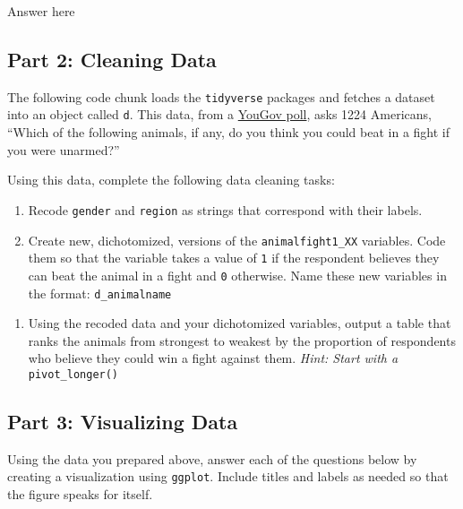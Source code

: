 \documentclass[
  letterpaper,
  DIV=11,
  numbers=noendperiod]{scrartcl}
\providecommand{\tightlist}{%
  \setlength{\itemsep}{0pt}\setlength{\parskip}{0pt}}\usepackage{longtable,booktabs,array}
\begin{document}
Answer here

\hypertarget{part-2-cleaning-data}{%
\subsection{Part 2: Cleaning Data}\label{part-2-cleaning-data}}

The following code chunk loads the \texttt{tidyverse} packages and
fetches a dataset into an object called \texttt{d}. This data, from a
\href{https://today.yougov.com/topics/society/articles-reports/2021/05/13/lions-and-tigers-and-bears-what-animal-would-win-f}{YouGov
poll}, asks 1224 Americans, ``Which of the following animals, if any, do
you think you could beat in a fight if you were unarmed?''

Using this data, complete the following data cleaning tasks:

\begin{enumerate}
\def\labelenumi{\arabic{enumi}.}
\tightlist
\item
  Recode \texttt{gender} and \texttt{region} as strings that correspond
  with their labels.
\item
  Create new, dichotomized, versions of the \texttt{animalfight1\_XX}
  variables. Code them so that the variable takes a value of \texttt{1}
  if the respondent believes they can beat the animal in a fight and
  \texttt{0} otherwise. Name these new variables in the format:
  \texttt{d\_animalname}
\end{enumerate}

\begin{enumerate}
\def\labelenumi{\arabic{enumi}.}
\setcounter{enumi}{2}
\tightlist
\item
  Using the recoded data and your dichotomized variables, output a table
  that ranks the animals from strongest to weakest by the proportion of
  respondents who believe they could win a fight against them.
  \emph{Hint: Start with a} \texttt{pivot\_longer()}
\end{enumerate}

\hypertarget{part-3-visualizing-data}{%
\subsection{Part 3: Visualizing Data}\label{part-3-visualizing-data}}

Using the data you prepared above, answer each of the questions below by
creating a visualization using \texttt{ggplot}. Include titles and
labels as needed so that the figure speaks for itself.
\end{document}
